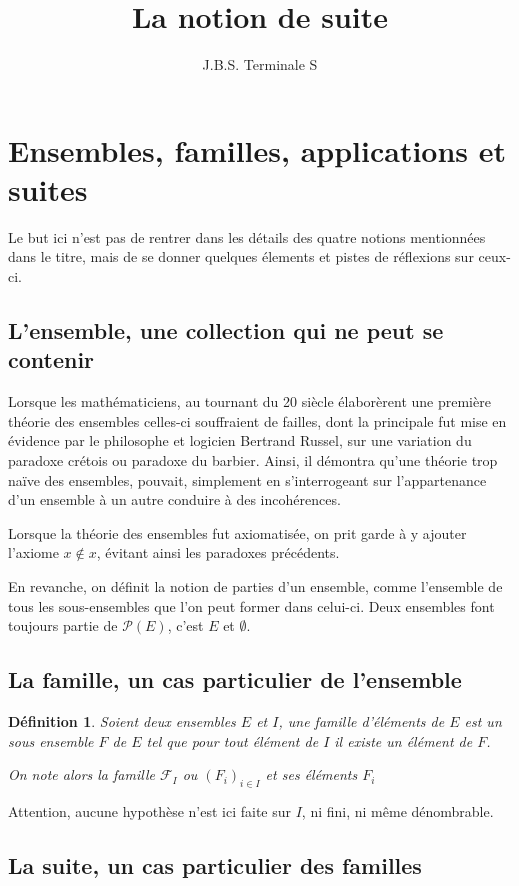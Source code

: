 \documentclass[12pt,a4paper]{article}
\title{La notion de suite}
\author{J.B.S. Terminale S}
\date{}
\makeatletter
\renewcommand{\maketitle}%
{\framebox{%
    \begin{minipage}{1.0\linewidth}%
      \begin{center}%
        \Large \@title ~-- \@author \\%
        \@date%
      \end{center}%
    \end{minipage}}%
  \normalsize%
}
\theoremstyle{break}
\newtheorem{definition}{Définition}
\theoremstyle{plain}
\theoremstyle{nonumberplain}
\makeatother
\begin{document}
\maketitle

\section{Ensembles, familles, applications et suites}

Le but ici n'est pas de rentrer dans les détails des quatre notions
mentionnées dans le titre, mais de se donner quelques élements et pistes
de réflexions sur ceux-ci.

\subsection{L'ensemble, une collection qui ne peut se contenir}

Lorsque les mathématiciens, au tournant du 20\ieme{} siècle élaborèrent
une première théorie des ensembles celles-ci souffraient de failles,
dont la principale fut mise en évidence par le philosophe et logicien
Bertrand Russel, sur une variation du paradoxe crétois ou paradoxe du
barbier. Ainsi, il démontra qu'une théorie trop naïve des ensembles,
pouvait, simplement en s'interrogeant sur l'appartenance d'un ensemble à
un autre conduire à des incohérences.

Lorsque la théorie des ensembles fut axiomatisée, on prit garde à y
ajouter l'axiome $x\not\in x$, évitant ainsi les paradoxes précédents.

En revanche, on définit la notion de parties d'un ensemble, comme l'ensemble
de tous les sous-ensembles que l'on peut former dans celui-ci. Deux ensembles
font toujours partie de $\mathscr{P}(E)$, c'est $E$ et $\emptyset$.

\subsection{La famille, un cas particulier de l'ensemble}

\begin{definition}
	Soient deux ensembles $E$ et $I$, une famille d'éléments de $E$ est un sous
	ensemble $F$ de $E$ tel que pour tout élément de $I$ il existe un élément de
	$F$.
	
	On note alors la famille $\mathscr{F}_I$  ou $(F_i)_{i\in I}$ et ses éléments
	$F_i$
\end{definition}

Attention, aucune hypothèse n'est ici faite sur $I$, ni fini, ni même dénombrable.

\subsection{La suite, un cas particulier des familles}
\end{document}
